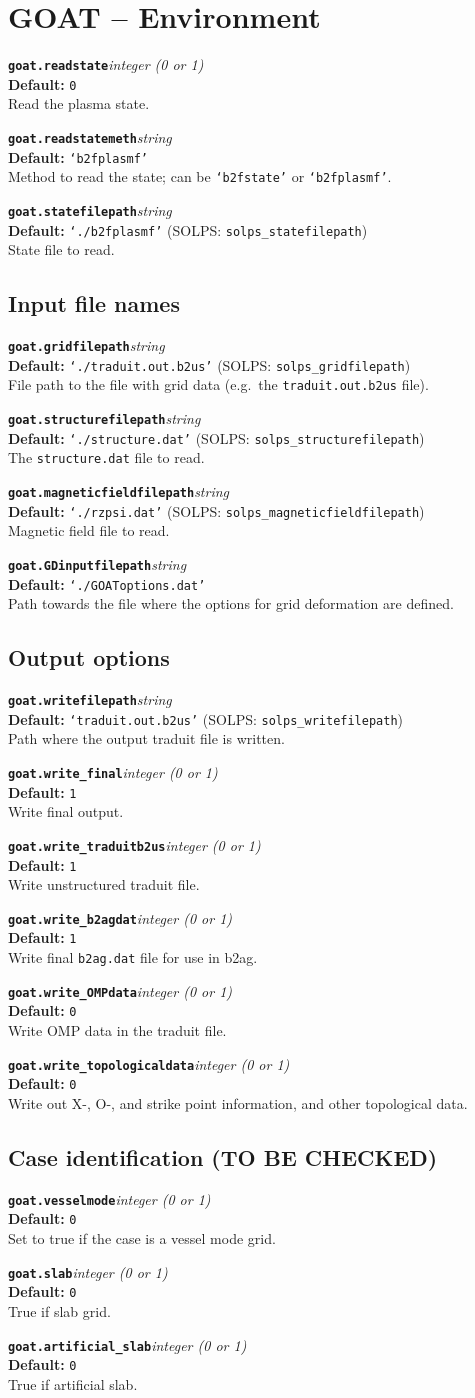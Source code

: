 \documentclass[10pt,a4paper]{article}
\newcommand{\sw}[4]{%
  \par\vspace{0.7em}%
  \begin{minipage}{\linewidth}\raggedright
    \textbf{\texttt{#1}}\hfill\textit{#2}\\[0.1em]
    \textbf{Default:} #3\\[0.1em]
    #4\par
    \vspace{0.3em}{\color{swgrey}\hrule}
  \end{minipage}\par}
\begin{document}
\section{GOAT -- Environment}
\sw{goat.readstate}{integer (0 or 1)}{\texttt{0}}{Read the plasma state.}
\sw{goat.readstatemeth}{string}{\texttt{`b2fplasmf'}}{Method to read the state; can be \texttt{`b2fstate'} or \texttt{`b2fplasmf'}.}
\sw{goat.statefilepath}{string}{\texttt{`./b2fplasmf'} (SOLPS: \texttt{solps\_statefilepath})}{State file to read.}


\subsection*{Input file names}
\sw{goat.gridfilepath}{string}{\texttt{`./traduit.out.b2us'} (SOLPS: \texttt{solps\_gridfilepath})}{File path to the file with grid data (e.g.\ the \texttt{traduit.out.b2us} file).}
\sw{goat.structurefilepath}{string}{\texttt{`./structure.dat'} (SOLPS: \texttt{solps\_structurefilepath})}{The \texttt{structure.dat} file to read.}
\sw{goat.magneticfieldfilepath}{string}{\texttt{`./rzpsi.dat'} (SOLPS: \texttt{solps\_magneticfieldfilepath})}{Magnetic field file to read.}
\sw{goat.GDinputfilepath}{string}{\texttt{`./GOAToptions.dat'}}{Path towards the file where the options for grid deformation are defined.}

\subsection*{Output options}
\sw{goat.writefilepath}{string}{\texttt{`traduit.out.b2us'} (SOLPS: \texttt{solps\_writefilepath})}{Path where the output traduit file is written.}
\sw{goat.write_final}{integer (0 or 1)}{\texttt{1}}{Write final output.}
\sw{goat.write_traduitb2us}{integer (0 or 1)}{\texttt{1}}{Write unstructured traduit file.}
\sw{goat.write_b2agdat}{integer (0 or 1)}{\texttt{1}}{Write final \texttt{b2ag.dat} file for use in b2ag.}
\sw{goat.write_OMPdata}{integer (0 or 1)}{\texttt{0}}{Write OMP data in the traduit file.}
\sw{goat.write_topologicaldata}{integer (0 or 1)}{\texttt{0}}{Write out X-, O-, and strike point information, and other topological data.}

\subsection*{Case identification (TO BE CHECKED)}
\sw{goat.vesselmode}{integer (0 or 1)}{\texttt{0}}{Set to true if the case is a vessel mode grid.}
\sw{goat.slab}{integer (0 or 1)}{\texttt{0}}{True if slab grid.}
\sw{goat.artificial_slab}{integer (0 or 1)}{\texttt{0}}{True if artificial slab.}
\end{document}
